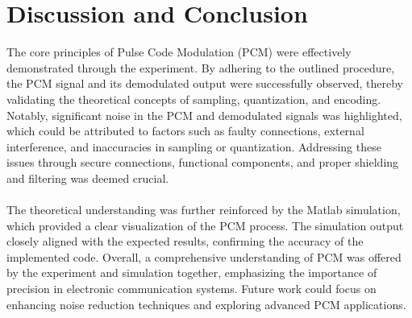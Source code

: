 \documentclass[12pt]{article}
\begin{document}
\section*{Discussion and Conclusion}
The core principles of Pulse Code Modulation (PCM) were effectively demonstrated through the experiment. By adhering to the outlined procedure, the PCM signal and its demodulated output were successfully observed, thereby validating the theoretical concepts of sampling, quantization, and encoding. Notably, significant noise in the PCM and demodulated signals was highlighted, which could be attributed to factors such as faulty connections, external interference, and inaccuracies in sampling or quantization. Addressing these issues through secure connections, functional components, and proper shielding and filtering was deemed crucial.
\\\\
The theoretical understanding was further reinforced by the Matlab simulation, which provided a clear visualization of the PCM process. The simulation output closely aligned with the expected results, confirming the accuracy of the implemented code. Overall, a comprehensive understanding of PCM was offered by the experiment and simulation together, emphasizing the importance of precision in electronic communication systems. Future work could focus on enhancing noise reduction techniques and exploring advanced PCM applications.


\renewcommand{\bibname}{References}

\end{document}
